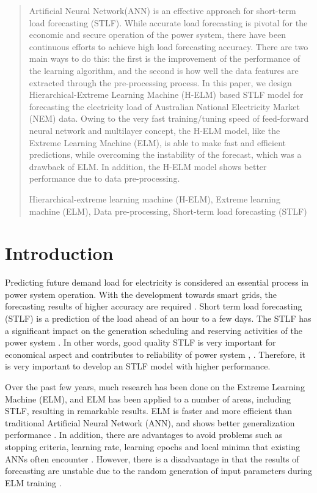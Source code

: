 \documentclass[runningheads,a4paper]{llncs}
\newcommand{\keywords}[1]{\par\addvspace\baselineskip
\noindent\keywordname\enspace\ignorespaces#1}
\begin{document}
\begin{abstract}
Artificial Neural Network(ANN) is an effective approach for short-term load forecasting (STLF). While accurate load forecasting is pivotal for the economic and secure operation of the power system, there have been continuous efforts to achieve high load forecasting accuracy. There are two main ways to do this: the first is the improvement of the performance of the learning algorithm, and the second is how well the data features are extracted through the pre-processing process. In this paper, we design Hierarchical-Extreme Learning Machine (H-ELM) based STLF model for forecasting the electricity load of Australian National Electricity Market (NEM) data. Owing to the very fast training/tuning speed of feed-forward neural network and multilayer concept, the H-ELM model, like the Extreme Learning Machine (ELM), is able to make fast and efficient predictions, while overcoming the instability of the forecast, which was a drawback of ELM. In addition, the H-ELM model shows better performance due to data pre-processing.
\keywords{Hierarchical-extreme learning machine (H-ELM), Extreme learning machine (ELM), Data pre-processing, Short-term load forecasting (STLF)}
\end{abstract}


\section{Introduction}

Predicting future demand load for electricity is considered an essential process in power system operation. With the development towards smart grids, the forecasting results of higher accuracy are required \cite{importance_load_forecast}. Short term load forecasting (STLF) is a prediction of the load ahead of an hour to a few days. The STLF has a significant impact on the generation scheduling and reserving activities of the power system \cite{ensemble_elm}. In other words, good quality STLF is very important for economical aspect and contributes to reliability of power system \cite{reliability}, \cite{economic}. Therefore, it is very important to develop an STLF model with higher performance.

Over the past few years, much research has been done on the Extreme Learning Machine (ELM), and ELM has been applied to a number of areas, including STLF, resulting in remarkable results. ELM is faster and more efficient than traditional Artificial Neural Network (ANN), and shows better generalization performance \cite{elm_theory}. In addition, there are advantages to avoid problems such as stopping criteria, learning rate, learning epochs and local minima that existing ANNs often encounter \cite{elm_better_than_ann}. However, there is a disadvantage in that the results of forecasting are unstable due to the random generation of input parameters during ELM training \cite{ensemble_elm}.
\end{document}
